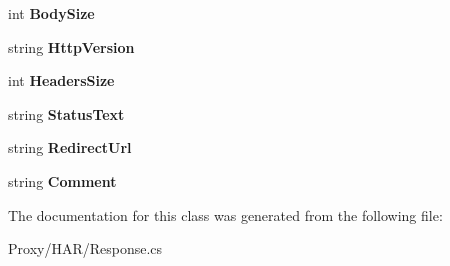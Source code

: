 \begin{DoxyCompactItemize}
\item 
\hypertarget{class_proto_test_1_1_golem_1_1_proxy_1_1_h_a_r_1_1_response_ad88f49f74a322908f7d9c199b559551f}{int {\bfseries Body\-Size}}\label{class_proto_test_1_1_golem_1_1_proxy_1_1_h_a_r_1_1_response_ad88f49f74a322908f7d9c199b559551f}

\item 
\hypertarget{class_proto_test_1_1_golem_1_1_proxy_1_1_h_a_r_1_1_response_a4e4dc23ae0889108db6fd9443e152ff6}{string {\bfseries Http\-Version}}\label{class_proto_test_1_1_golem_1_1_proxy_1_1_h_a_r_1_1_response_a4e4dc23ae0889108db6fd9443e152ff6}

\item 
\hypertarget{class_proto_test_1_1_golem_1_1_proxy_1_1_h_a_r_1_1_response_a2edb091832c0c9d6377aa91895851f32}{int {\bfseries Headers\-Size}}\label{class_proto_test_1_1_golem_1_1_proxy_1_1_h_a_r_1_1_response_a2edb091832c0c9d6377aa91895851f32}

\item 
\hypertarget{class_proto_test_1_1_golem_1_1_proxy_1_1_h_a_r_1_1_response_a9cbb3f7821197ba1e1e2c7315b8383be}{string {\bfseries Status\-Text}}\label{class_proto_test_1_1_golem_1_1_proxy_1_1_h_a_r_1_1_response_a9cbb3f7821197ba1e1e2c7315b8383be}

\item 
\hypertarget{class_proto_test_1_1_golem_1_1_proxy_1_1_h_a_r_1_1_response_a3b06a44b6745c48acd9d1b999647fea9}{string {\bfseries Redirect\-Url}}\label{class_proto_test_1_1_golem_1_1_proxy_1_1_h_a_r_1_1_response_a3b06a44b6745c48acd9d1b999647fea9}

\item 
\hypertarget{class_proto_test_1_1_golem_1_1_proxy_1_1_h_a_r_1_1_response_a1afe20d025e4fcfa218e30f85775d451}{string {\bfseries Comment}}\label{class_proto_test_1_1_golem_1_1_proxy_1_1_h_a_r_1_1_response_a1afe20d025e4fcfa218e30f85775d451}

\end{DoxyCompactItemize}


The documentation for this class was generated from the following file\-:\begin{DoxyCompactItemize}
\item 
Proxy/\-H\-A\-R/Response.\-cs\end{DoxyCompactItemize}
